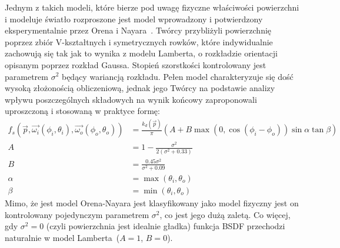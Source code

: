 Jednym z takich modeli, które bierze pod uwagę fizyczne właściwości powierzchni i modeluje światło rozproszone jest model wprowadzony i potwierdzony eksperymentalnie przez Orena i Nayara~\cite{Oren94generalizationof}\cite{Nayar95visualappearance}. Twórcy przybliżyli powierzchnię poprzez zbiór V-kształtnych i symetrycznych rowków, które indywidualnie zachowują się tak jak to wynika z modelu Lamberta, o rozkładzie orientacji opisanym poprzez rozkład Gaussa. Stopień szorstkości kontrolowany jest parametrem $\sigma^2$ będący wariancją rozkładu. Pełen model charakteryzuje się dość wysoką złożonością obliczeniową, jednak jego Twórcy na podstawie analizy wpływu poszczególnych składowych na wynik końcowy zaproponowali uproszczoną i stosowaną w praktyce formę:
\begin{align}
f_s(\vec{p}, \vec{\omega_i}(\phi_i, \theta_i), \vec{\omega_o}(\phi_o, \theta_o)) &= \frac{k_d(\vec{p})}{\pi}(A + B\max(0, \cos(\phi_i - \phi_o))\sin\alpha\tan\beta)\\
A &= 1 - \frac{\sigma^2}{2(\sigma^2 + 0.33)}\\
B &= \frac{0.45\sigma^2}{\sigma^2 + 0.09}\\
\alpha &= \max(\theta_i, \theta_o)\\
\beta &= \min(\theta_i, \theta_o)
\end{align}
Mimo, że jest model Orena-Nayara jest klasyfikowany jako model fizyczny jest on kontrolowany pojedynczym parametrem $\sigma^2$, co jest jego dużą zaletą. Co więcej, gdy $\sigma^2 = 0$ (czyli powierzchnia jest idealnie gładka) funkcja BSDF przechodzi naturalnie w model Lamberta~($A=1$, $B=0$).

